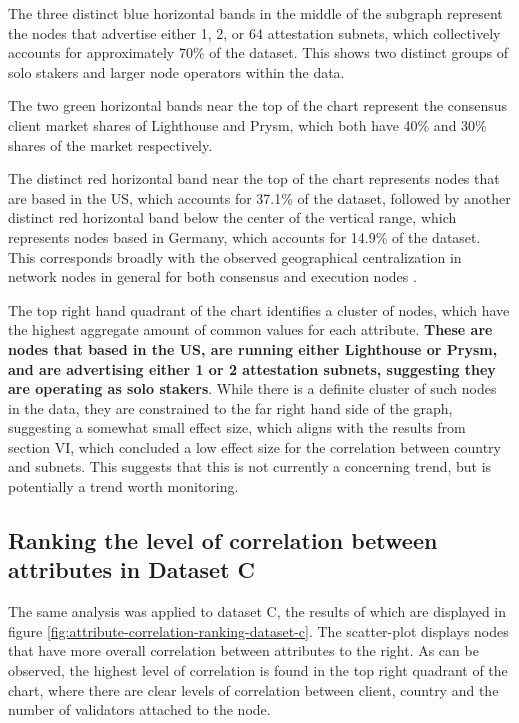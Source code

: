 \documentclass[conference]{IEEEtran}
\begin{document}
The three distinct blue horizontal bands in the middle of the subgraph represent the nodes that advertise either 1, 2, or 64 attestation subnets, which collectively accounts for approximately 70\% of the dataset. This shows two distinct groups of solo stakers and larger node operators within the data.

The two green horizontal bands near the top of the chart represent the consensus client market shares of Lighthouse and Prysm, which both have 40\% and 30\% shares of the market respectively.

The distinct red horizontal band near the top of the chart represents nodes that are based in the US, which accounts for 37.1\% of the dataset, followed by another distinct red horizontal band below the center of the vertical range, which represents nodes based in Germany, which accounts for 14.9\% of the dataset.  This corresponds broadly with the observed geographical centralization in network nodes in general for both consensus and execution nodes \cite{nodewatch2024}.

The top right hand quadrant of the chart identifies a cluster of nodes, which have the highest aggregate amount of common values for each attribute.  \textbf{These are nodes that based in the US, are running either Lighthouse or Prysm, and are advertising either 1 or 2 attestation subnets, suggesting they are operating as solo stakers}.  While there is a definite cluster of such nodes in the data, they are constrained to the far right hand side of the graph, suggesting a somewhat small effect size, which aligns with the results from section VI, which concluded a low effect size for the correlation between country and subnets.  This suggests that this is not currently a concerning trend, but is potentially a trend worth monitoring.

\subsection{Ranking the level of correlation between attributes in Dataset C}

The same analysis was applied to dataset C, the results of which are displayed in figure \ref{fig:attribute-correlation-ranking-dataset-c}.  The scatter-plot displays nodes that have more overall correlation between attributes to the right.  As can be observed, the highest level of correlation is found in the top right quadrant of the chart, where there are clear levels of correlation between client, country and the number of validators attached to the node. %
\end{document}
